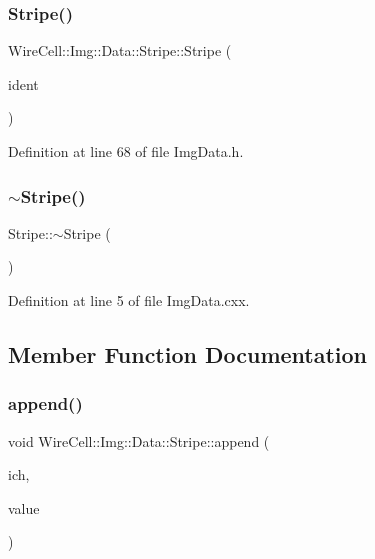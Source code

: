 \subsubsection{\texorpdfstring{Stripe()}{Stripe()}}
{\footnotesize\ttfamily Wire\+Cell\+::\+Img\+::\+Data\+::\+Stripe\+::\+Stripe (\begin{DoxyParamCaption}\item[{int}]{ident }\end{DoxyParamCaption})\hspace{0.3cm}{\ttfamily [inline]}}



Definition at line 68 of file Img\+Data.\+h.

\mbox{\label{class_wire_cell_1_1_img_1_1_data_1_1_stripe_ae6eb51e2a280c409bafefc550ce2a8ee}} 
\subsubsection{\texorpdfstring{$\sim$\+Stripe()}{~Stripe()}}
{\footnotesize\ttfamily Stripe\+::$\sim$\+Stripe (\begin{DoxyParamCaption}{ }\end{DoxyParamCaption})\hspace{0.3cm}{\ttfamily [virtual]}}



Definition at line 5 of file Img\+Data.\+cxx.



\subsection{Member Function Documentation}
\mbox{\label{class_wire_cell_1_1_img_1_1_data_1_1_stripe_a6db6bec2ca29d9ed1ebfa53ff046aa3c}} 
\subsubsection{\texorpdfstring{append()}{append()}}
{\footnotesize\ttfamily void Wire\+Cell\+::\+Img\+::\+Data\+::\+Stripe\+::append (\begin{DoxyParamCaption}\item[{\hyperlink{class_wire_cell_1_1_i_data_aff870b3ae8333cf9265941eef62498bc}{I\+Channel\+::pointer}}]{ich,  }\item[{\hyperlink{class_wire_cell_1_1_i_stripe_af0dd73bc2517c2c848c24ea56caefde6}{value\+\_\+t}}]{value }\end{DoxyParamCaption})\hspace{0.3cm}{\ttfamily [inline]}}



